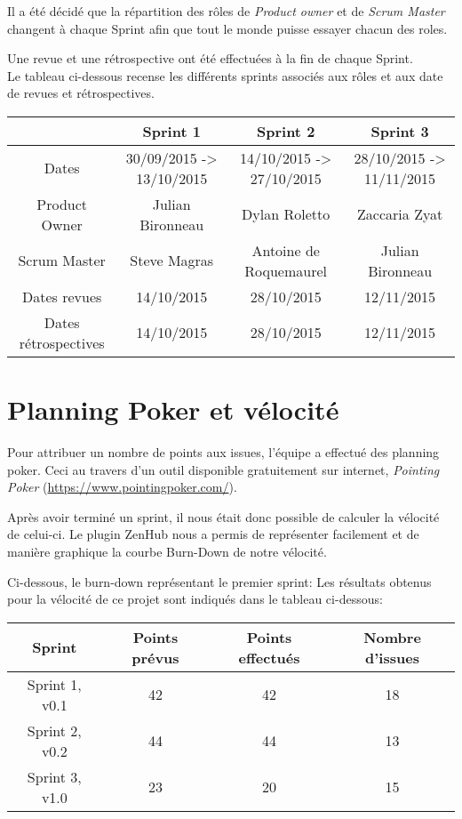 \documentclass[12pt,a4paper,oneside]{book}
\begin{document}
	Il a été décidé que la répartition des rôles de \textit{Product owner }et de \textit{Scrum Master }changent à chaque Sprint afin que tout le monde puisse essayer chacun des roles.
	
	Une revue et une rétrospective ont été effectuées à la fin de chaque Sprint.\\
	Le tableau ci-dessous recense les différents sprints associés aux rôles et aux date de revues et rétrospectives.

	\hspace{-40px}
	\begin{tabular}{|c|c|c|c|}
		\hline
		& \textbf{Sprint 1 }& \textbf{Sprint 2 }& \textbf{Sprint 3}\\
		\hline
		Dates & 30/09/2015 -> 13/10/2015 & 14/10/2015 -> 27/10/2015 & 28/10/2015 -> 11/11/2015\\
		\hline
		Product Owner & Julian Bironneau &Dylan Roletto& Zaccaria Zyat\\
		\hline
		Scrum Master & Steve Magras & Antoine de Roquemaurel &Julian Bironneau\\
		\hline
		Dates revues & 14/10/2015& 28/10/2015& 12/11/2015\\
		\hline
		Dates rétrospectives & 14/10/2015& 28/10/2015 &12/11/2015 \\
		\hline
	\end{tabular}
	
	\section{Planning Poker et vélocité}
	Pour attribuer un nombre de points aux issues, l'équipe a effectué des planning poker. Ceci au travers d'un outil disponible
	gratuitement sur internet, \textit{Pointing Poker} (\url{https://www.pointingpoker.com/}).
	
	Après avoir terminé un sprint, il nous était donc possible de calculer la vélocité de celui-ci. Le plugin ZenHub nous a permis de représenter facilement et de manière graphique la courbe Burn-Down de notre vélocité. 
	
	Ci-dessous, le burn-down représentant le premier sprint:
	Les résultats obtenus pour la vélocité de ce projet sont indiqués dans le tableau ci-dessous:

	\begin{tabular}{|c|c|c|c|}
		\hline
		\textbf{Sprint} &\textbf{ Points prévus} & \textbf{Points effectués }&\textbf{ Nombre d'issues}\\
		\hline
		Sprint 1, v0.1 &42& 42& 18\\
		\hline
		Sprint 2, v0.2 &44& 44& 13\\
		\hline
		Sprint 3, v1.0 &23& 20& 15
	\end{tabular}
\end{document}
